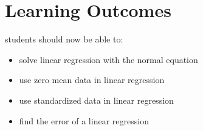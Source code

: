 \documentclass[12pt]{book}
\begin{document}
\section*{Learning Outcomes}
students should now be able to:
\begin{itemize}
        \item solve linear regression with the normal equation
        \item use zero mean data in linear regression
        \item use standardized data in linear regression
        \item find the error of a linear regression
\end{itemize}
\end{document}
